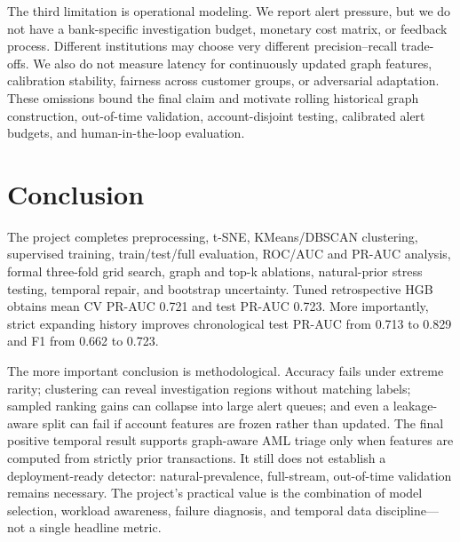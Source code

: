 \documentclass{article}
\begin{document}
The third limitation is operational modeling. We report alert pressure, but we do not have a bank-specific investigation budget, monetary cost matrix, or feedback process. Different institutions may choose very different precision--recall trade-offs. We also do not measure latency for continuously updated graph features, calibration stability, fairness across customer groups, or adversarial adaptation. These omissions bound the final claim and motivate rolling historical graph construction, out-of-time validation, account-disjoint testing, calibrated alert budgets, and human-in-the-loop evaluation.

\section{Conclusion}
The project completes preprocessing, t-SNE, KMeans/DBSCAN clustering, supervised training, train/test/full evaluation, ROC/AUC and PR-AUC analysis, formal three-fold grid search, graph and top-k ablations, natural-prior stress testing, temporal repair, and bootstrap uncertainty. Tuned retrospective HGB obtains mean CV PR-AUC 0.721 and test PR-AUC 0.723. More importantly, strict expanding history improves chronological test PR-AUC from 0.713 to 0.829 and F1 from 0.662 to 0.723.

The more important conclusion is methodological. Accuracy fails under extreme rarity; clustering can reveal investigation regions without matching labels; sampled ranking gains can collapse into large alert queues; and even a leakage-aware split can fail if account features are frozen rather than updated. The final positive temporal result supports graph-aware AML triage only when features are computed from strictly prior transactions. It still does not establish a deployment-ready detector: natural-prevalence, full-stream, out-of-time validation remains necessary. The project's practical value is the combination of model selection, workload awareness, failure diagnosis, and temporal data discipline---not a single headline metric.
\end{document}
